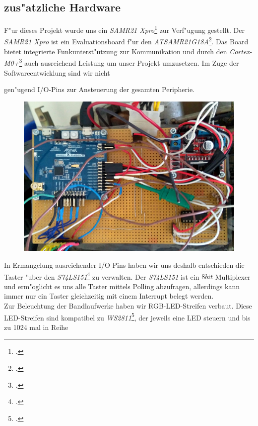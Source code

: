\documentclass[a4paper]{article}
\begin{document}
  \subsection{zus"atzliche Hardware}
    \label{sec:hardware_additional}
    F"ur dieses Projekt wurde uns ein \textit{SAMR21 Xpro}\footcite{SAMR21XPro} zur Verf"ugung
    gestellt. Der \textit{SAMR21 Xpro} ist ein Evaluationsboard f"ur den
    \textit{ATSAMR21G18A}\footcite{ATSAMR21}. Das Board bietet integrierte Funkunterst"utzung zur
    Kommunikation und durch den \textit{Cortex-M0+}\footcite{CORTEXM0} auch ausreichend Leistung
    um unser Projekt umzusetzen. Im Zuge der Softwareentwicklung sind wir nicht

    gen"ugend I/O-Pins zur Ansteuerung der gesamten Peripherie.\\
    \begin{figure}
      \centering
      \label{figure:Hardwareplattform}
      \includegraphics[scale=0.05]{Platine.jpg}
    \end{figure}
    In Ermangelung ausreichender I/O-Pins haben wir uns deshalb entschieden die Taster "uber den
    \textit{S74LS151}\footcite{S74LS151} zu verwalten. Der \textit{S74LS151} ist
    ein \( 8 bit \) Multiplexer und erm"oglicht es uns alle Taster mittels Polling abzufragen,
    allerdings kann immer nur ein Taster gleichzeitig mit einem Interrupt belegt werden.\\ Zur
    Beleuchtung der Bandlaufwerke haben wir RGB-LED-Streifen verbaut. Diese LED-Streifen sind
    kompatibel zu \textit{WS2811}\footcite{WS2811}, der jeweils eine LED steuern und bis zu 1024 mal in Reihe
\end{document}
